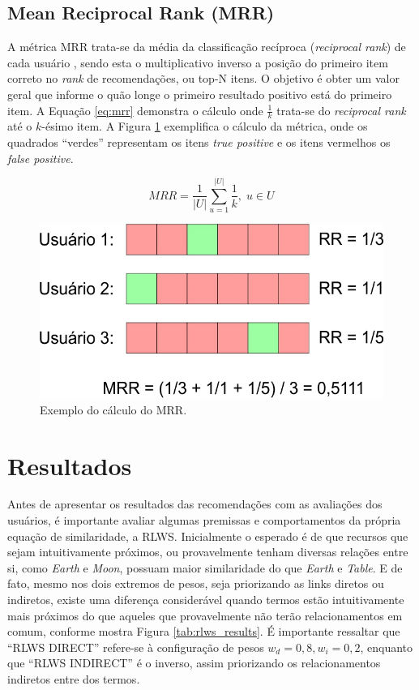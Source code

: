 \subsection{Mean Reciprocal Rank (MRR)}

A métrica \ac{MRR} trata-se da média da classificação recíproca (\textit{reciprocal rank}) de cada usuário \citep{Burges:2006}, sendo esta o multiplicativo inverso a posição do primeiro item correto no \textit{rank} de recomendações, ou top-N itens. O objetivo é obter um valor geral que informe o quão longe o primeiro resultado positivo está do primeiro item. A Equação \ref{eq:mrr} demonstra o cálculo onde $\frac{1}{k}$ trata-se do \textit{reciprocal rank} até o $k$-ésimo item. A Figura \ref{fig:mrr_ex} exemplifica o cálculo da métrica, onde os quadrados \enquote{verdes} representam os itens \textit{true positive} e os itens vermelhos os \textit{false positive}.

\begin{equation}
	MRR = \frac{1}{|U|} \sum_{u=1}^{|U|} \frac{1}{k}, \; u \in U
\label{eq:mrr}
\end{equation}

\begin{figure}
	\centering
	\includegraphics[scale=0.4]{imagens/mrr_ex.jpg}
	\caption{Exemplo do cálculo do MRR.}
	\label{fig:mrr_ex}
\end{figure}

\section{Resultados}
\label{sec:results}

Antes de apresentar os resultados das recomendações com as avaliações dos usuários, é importante avaliar algumas premissas e comportamentos da própria equação de similaridade, a \ac{RLWS}. Inicialmente o esperado é de que recursos que sejam intuitivamente próximos, ou provavelmente tenham diversas relações entre si,  como \textit{Earth} e \textit{Moon}, possuam maior similaridade do que \textit{Earth} e \textit{Table}. E de fato, mesmo nos dois extremos de pesos, seja priorizando as links diretos ou indiretos, existe uma diferença considerável quando termos estão intuitivamente mais próximos do que aqueles que provavelmente não terão relacionamentos em comum, conforme mostra Figura \ref{tab:rlws_results}. É importante ressaltar que \enquote{RLWS DIRECT} refere-se à configuração de pesos $w_d = 0,8, w_i = 0,2$, enquanto que \enquote{RLWS INDIRECT} é o inverso, assim priorizando os relacionamentos indiretos entre dos termos.

